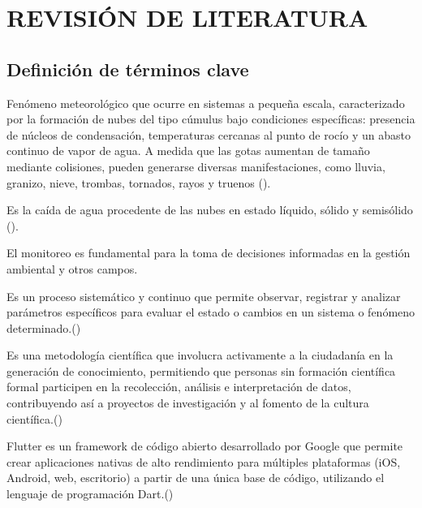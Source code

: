 \chapter{REVISIÓN DE LITERATURA}
\label{cap:3}

\section{Definición de términos clave}
\begin{definition}[Precipitación]
 Fenómeno meteorológico que ocurre en sistemas a pequeña escala, caracterizado por la formación de nubes del tipo cúmulus bajo condiciones específicas: presencia de núcleos de condensación, temperaturas cercanas al punto de rocío y un abasto continuo de vapor de agua. A medida que las gotas aumentan de tamaño mediante colisiones, pueden generarse diversas manifestaciones, como lluvia, granizo, nieve, trombas, tornados, rayos y truenos  (\cite{ahrens2020}).
\end{definition}

\begin{definition}[Lluvia]
    Es la caída de agua procedente de las nubes en estado líquido, sólido y semisólido (\cite{breña2013}).
\end{definition}


El monitoreo es fundamental para la toma de decisiones informadas en la gestión ambiental y otros campos.
\begin{definition}[Monitoreo]
  Es un proceso sistemático y continuo que permite observar, registrar y analizar parámetros específicos para evaluar el estado o cambios en un sistema o fenómeno determinado.(\cite{ciga_monitoreo})
\end{definition}


\begin{definition}
Es una metodología científica que involucra activamente a la ciudadanía en la generación de conocimiento, permitiendo que personas sin formación científica formal participen en la recolección, análisis e interpretación de datos, contribuyendo así a proyectos de investigación y al fomento de la cultura científica.(\cite{csic_ciencia_ciudadana})
\end{definition}


\begin{definition}[Flutter]
Flutter es un framework de código abierto desarrollado por Google que permite crear aplicaciones nativas de alto rendimiento para múltiples plataformas (iOS, Android, web, escritorio) a partir de una única base de código, utilizando el lenguaje de programación Dart.(\cite{flutter_multiplataforma})
\end{definition}


